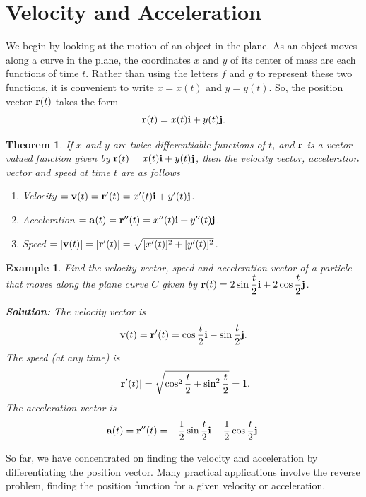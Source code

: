 \documentclass[titlepage,a4paper,12pt]{report}
\newtheorem{example}{Example}[section]
\newtheorem{theorem}{Theorem}[section]
\begin{document}
\section{Velocity and Acceleration}
We begin by looking at the motion of an object in the plane.  As an object moves along a curve in the plane, the coordinates $x$ and $y$ of its center of mass are each functions of time $t$. Rather than using the letters $f$ and $g$ to represent these two functions, it is convenient to write $x=x(t)$ and $y=y(t)$. So, the position vector ${\bf{r}}(t)$ takes the form 
\[{\bf{r}}(t)=x(t){\bf{i}}+y(t){\bf{j}}.\]
\begin{theorem}
If $x$ and $y$ are twice-differentiable functions of $t$, and ${\bf{r}}$ is a vector-valued function given by ${\bf{r}}(t)=x(t){\bf{i}}+y(t){\bf{j}}$, then the velocity vector, acceleration vector and speed at time $t$ are as follows 
\begin{enumerate}
\item Velocity $= {\bf{v}}(t)={\bf{r}}'(t)=x'(t){\bf{i}}+y'(t){\bf{j}}$.
\item Acceleration $={\bf{a}}(t)={\bf{r}}''(t)=x''(t){\bf{i}}+y''(t){\bf{j}}$.
\item Speed $=|{\bf{v}}(t)|=|{\bf{r}}'(t)|=\sqrt{[x'(t)]^2+[y'(t)]^2}$.
\end{enumerate}
\end{theorem}
\begin{example}
Find the velocity vector, speed and acceleration vector of a particle that moves along the plane curve $C$ given by ${\bf{r}}(t)=2\sin \dfrac{t}{2}{\bf{i}}+2\cos \dfrac{t}{2}{\bf{j}}$.

\noindent \textbf{Solution:} The velocity vector is 
\[{\bf{v}}(t)={\bf{r}}'(t)=\cos \dfrac{t}{2}{\bf{i}}-\sin \dfrac{t}{2}{\bf{j}}.\] The speed (at any time) is 
\[|{\bf{r}}'(t)|=\sqrt{\cos ^2 \dfrac{t}{2}+\sin ^2 \dfrac{t}{2}}=1.\] The acceleration vector is 
\[{\bf{a}}(t)={\bf{r}}''(t)=-\dfrac{1}{2}\sin \dfrac{t}{2}{\bf{i}}-\dfrac{1}{2}\cos \dfrac{t}{2}{\bf{j}}.\]
\end{example}
\noindent So far, we have concentrated on finding the velocity and acceleration by differentiating the position vector. Many practical applications involve the reverse problem, finding the position function for a given velocity or acceleration.
\end{document}
